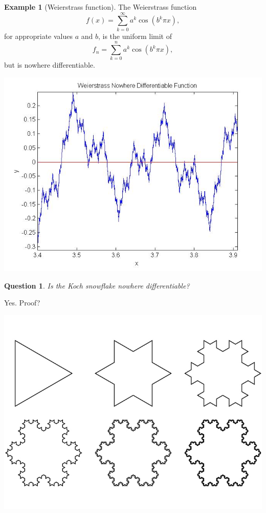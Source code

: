 \documentclass[12pt]{article}
\theoremstyle{plain}
\newtheorem{question}[theorem]{Question}
\theoremstyle{definition}
\newtheorem{example}[theorem]{Example}
\theoremstyle{remark}
\begin{document}
\begin{example}[Weierstrass function]
The Weierstrass function $$f(x) = \sum^\infty_{k=0} a^k \cos(b^k \pi x),$$ for appropriate values $a$ and $b$, is the uniform limit of $$f_n = \sum^n_{k=0} a^k \cos(b^k \pi x),$$ but is nowhere differentiable.
\end{example}

\centerline{\includegraphics[width=1.0\textwidth]{nodiff1}}

\begin{question}
Is the Koch snowflake nowhere differentiable?
\end{question}

Yes. Proof?

\centerline{\includegraphics[width=1.0\textwidth]{biomimicry-koch-snowflake}}
\end{document}
